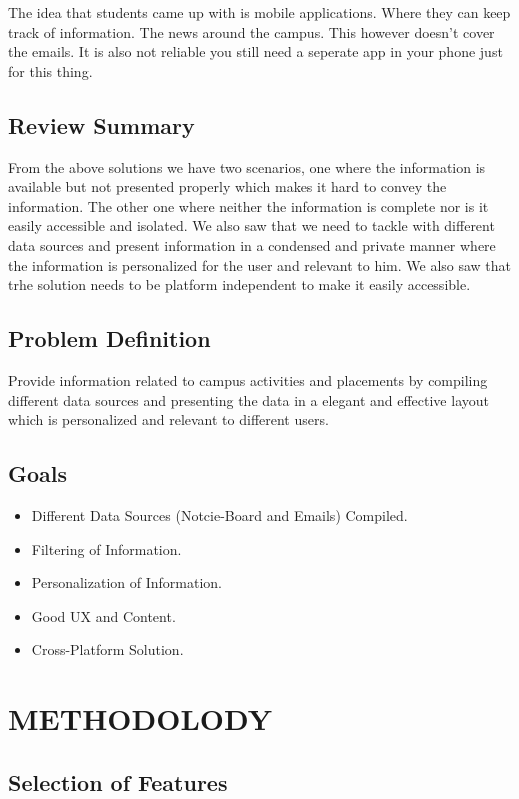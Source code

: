 \documentclass[14pt]{extarticle}
\begin{document}
The idea that students came up with is mobile applications. Where they can keep track of information. The news around the campus. This however doesn't cover the emails. It is also not reliable you still need a seperate app in your phone just for this thing.

\subsection{Review Summary}

From the above solutions we have two scenarios, one where the information is available but not presented properly which makes it hard to convey the information. The other one where neither the information is complete nor is it easily accessible and isolated. We also saw that we need to tackle with different data sources and present information in a condensed and private manner where the information is personalized for the user and relevant to him. We also saw that trhe solution needs to be platform independent to make it easily accessible.
\subsection{Problem Definition}

Provide information related to campus activities and placements by compiling different data sources and presenting the data in a elegant and effective layout which is personalized and relevant to different users.
\subsection{Goals}

\begin{itemize}
    \item Different Data Sources (Notcie-Board and Emails) Compiled.
    \item Filtering of Information.
    \item Personalization of Information.
    \item Good UX and Content.
    \item Cross-Platform Solution.
\end{itemize}

\newpage
\section{METHODOLODY}

\subsection{Selection of Features}
\end{document}
